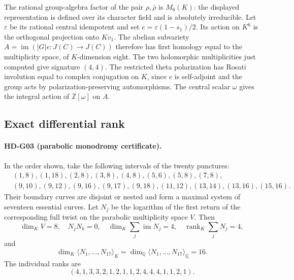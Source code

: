 The rational group-algebra factor of the pair $\rho,\bar\rho$ is
$M_6(K)$: the displayed representation is defined over its character
field and is absolutely irreducible. Let $\varepsilon$ be its rational
central idempotent and set $e=\varepsilon(1-s_1)/2$. Its action on
$K^6$ is the orthogonal projection onto $Kv_1$. The abelian subvariety
$A=\operatorname{im}(|G|e:J(C)\to J(C))$ therefore has first homology
equal to the multiplicity space, of $K$-dimension eight. The two
holomorphic multiplicities just computed give signature $(4,4)$.
The restricted theta polarization has Rosati involution equal to complex
conjugation on $K$, since $e$ is self-adjoint and the group acts by
polarization-preserving automorphisms. The central scalar $\omega$ gives
the integral action of $\mathbb Z[\omega]$ on $A$.

\subsection{Exact differential rank}

\paragraph{HD-G03 (parabolic monodromy certificate).}
In the order shown, take the following intervals of the twenty punctures:
\[
\begin{split}
&(1,8),(1,18),(2,8),(3,8),(4,8),(5,6),(5,8),(7,8),\\
&(9,10),(9,12),(9,16),(9,17),(9,18),(11,12),(13,14),(13,16),(15,16).
\end{split}
\]
Their boundary curves are disjoint or nested and form a maximal system
of seventeen essential curves. Let $N_j$ be the logarithm of the first
return of the corresponding full twist on the parabolic multiplicity
space $V$. Then
\[
\dim_KV=8,\quad N_jN_k=0,\quad
\dim_K\sum_j\operatorname{im}N_j=4,\quad
\operatorname{rank}_K\sum_jN_j=4,
\]
and
\[
\dim_K\langle N_1,\ldots,N_{17}\rangle_K
=\dim_{\mathbb Q}\langle N_1,\ldots,N_{17}\rangle_{\mathbb Q}=16.
\]
The individual ranks are
\[
(4,1,3,3,2,1,2,1,1,2,4,4,4,1,1,2,1).
\]

